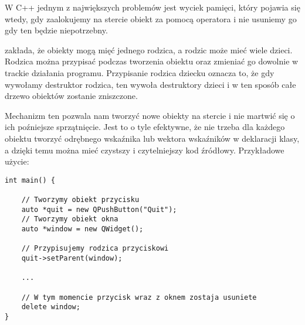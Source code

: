 
\par
W C++ jednym z największych problemów jest wyciek pamięci, który pojawia się wtedy, gdy zaalokujemy na stercie obiekt za pomocą operatora  i nie usuniemy go gdy ten będzie niepotrzebny.
\par
{} zakłada, że obiekty mogą mięć jednego rodzica, a rodzic może mieć wiele dzieci.
Rodzica można przypisać podczas tworzenia obiektu oraz zmieniać go dowolnie w trackie działania programu.
Przypisanie rodzica dziecku oznacza to, że gdy wywołamy destruktor rodzica, ten wywoła destruktory dzieci i w ten sposób całe drzewo obiektów zostanie zniszczone.
\par
Mechanizm ten pozwala nam tworzyć nowe obiekty na stercie i nie martwić się o ich poźniejsze sprzątnięcie.
Jest to o tyle efektywne, że nie trzeba dla każdego obiektu tworzyć odrębnego wskaźnika lub wektora wskaźników w deklaracji klasy, a dzięki temu można mieć czystszy i czytelniejszy kod źródłowy.
Przykładowe użycie:
\par
\begin{lstlisting}
int main() {

    // Tworzymy obiekt przycisku
    auto *quit = new QPushButton("Quit");
    // Tworzymy obiekt okna
    auto *window = new QWidget();

    // Przypisujemy rodzica przyciskowi
    quit->setParent(window);
    
    ...

    // W tym momencie przycisk wraz z oknem zostaja usuniete
    delete window;
}
\end{lstlisting}